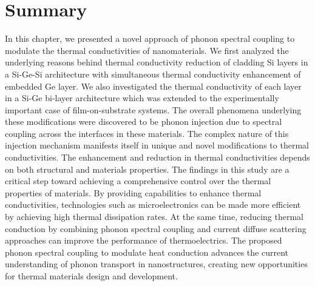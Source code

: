\section{Summary}
In this chapter, we presented a novel approach of phonon spectral coupling to modulate the thermal conductivities of nanomaterials. We first analyzed the underlying reasons behind thermal conductivity reduction of cladding Si layers in a Si-Ge-Si architecture with simultaneous thermal conductivity enhancement of embedded Ge layer. We also investigated the thermal conductivity of each layer in a Si-Ge bi-layer architecture which was extended to the experimentally important case of film-on-substrate systems. The overall phenomena underlying these modifications were discovered to be phonon injection due to spectral coupling across the interfaces in these materials. The complex nature of this injection mechanism manifests itself in unique and novel modifications to thermal conductivities. The enhancement and reduction in thermal conductivities depends on both structural and materials properties. The findings in this study are a critical step toward achieving a comprehensive control over the thermal properties of materials. By providing capabilities to enhance thermal conductivities, technologies such as microelectronics can be made more efficient by achieving high thermal dissipation rates. At the same time, reducing thermal conduction by combining phonon spectral coupling and current diffuse scattering approaches can improve the performance of thermoelectrics. The proposed phonon spectral coupling to modulate heat conduction advances the current understanding of phonon transport in nanostructures, creating new opportunities for thermal materials design and development.

